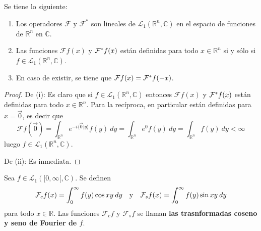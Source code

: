 \documentclass[12pt]{report}
\theoremstyle{largebreak}
\newcommand\pint[2]{\ensuremath{\langle#1| #2\rangle}}
\newcommand{\fou}[1]{\ensuremath{\mathcal{F}#1}}
\begin{document}
    \renewcommand{\theenumi}{\roman{enumi}}

    \begin{obs}
        Se tiene lo siguiente:
        \begin{enumerate}
            \item Los operadores $\mathcal{F}$ y $\mathcal{F}^*$ son lineales de $\mathcal{L}_1(\mathbb{R}^n,\mathbb{C})$ en el espacio de funciones de $\mathbb{R}^n$ en $\mathbb{C}$.
            \item Las funciones $\fou{f}(x)$ y $\fou^*{f}(x)$ están definidas para todo $x\in\mathbb{R}^n$ si y sólo si $f\in\mathcal{L}_1(\mathbb{R}^n,\mathbb{C})$.
            \item En caso de existir, se tiene que $\fou{f}(x)=\fou^*{f}(-x)$.
        \end{enumerate}
    \end{obs}

    \begin{proof}
        De (i): Es claro que si $f\in\mathcal{L}_1(\mathbb{R}^n,\mathbb{C})$ entonces $\fou{f}(x)$ y $\fou^*{f}(x)$ están definidas para todo $x\in\mathbb{R}^n$. Para la recíproca, en particular están definidas para $x=\vec{0}$, es decir que
        \begin{equation*}
            \fou{f}\left(\vec{0}\right)=\int_{\mathbb{R}^n}e^{ -i\pint{\vec{0}}{y}}f(y)\:dy=\int_{\mathbb{R}^n}e^{0}f(y)\:dy=\int_{\mathbb{R}^n}f(y)\:dy<\infty
        \end{equation*}
        luego $f\in\mathcal{L}_1(\mathbb{R}^n,\mathbb{C})$.

        De (ii): Es inmediata.
    \end{proof}

    \begin{mydef}
        Sea $f\in\mathcal{L}_1([0,\infty[,\mathbb{C})$. Se definen
        \begin{equation*}
            \mathcal{F}_cf(x)=\int_0^\infty f(y)\cos xy\:dy\quad\textup{y}\quad\mathcal{F}_sf(x)=\int_0^\infty f(y)\sin xy\:dy
        \end{equation*}
        para todo $x\in\mathbb{R}$. Las funciones $\mathcal{F}_cf$ y  $\mathcal{F}_sf$ se llaman \textbf{las trasnformadas coseno y seno de Fourier de $f$}.
    \end{mydef}
\end{document}
